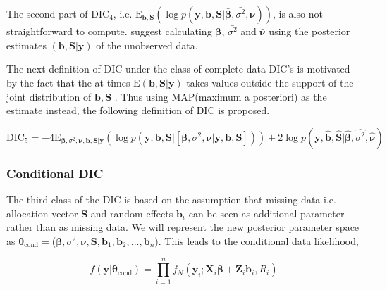 The second part of $\text{DIC}_4$, i.e. $\text{E}_{\boldsymbol{b},\boldsymbol{S}}(\log{p(\boldsymbol{y}, \boldsymbol{b}, \boldsymbol{S}|\boldsymbol{\bar{\beta}}, \bar{\sigma^2}, \boldsymbol{\bar{\nu}})})$, is also not straightforward to compute. \citet{celeux_deviance_2006} suggest calculating $\boldsymbol{\bar{\beta}}$, $\bar{\sigma^2}$ and $\boldsymbol{\bar{\nu}}$ using the posterior estimates $(\boldsymbol{b}, \boldsymbol{S} | \boldsymbol{y})$ of the unobserved data. 

The next definition of DIC under the class of complete data DIC's is motivated by the fact that the at times $\text{E}(\boldsymbol{b}, \boldsymbol{S}|\boldsymbol{y})$ takes values outside the support of the joint distribution of $\boldsymbol{b}, \boldsymbol{S}$ \citet{celeux_deviance_2006}. Thus using MAP(maximum a posteriori) as the estimate instead, the following definition of DIC is proposed.

\begin{equation}
\label{eq : DIC5}
\text{DIC}_5 = -4\text{E}_{\boldsymbol{\beta}, \sigma^2, \boldsymbol{\nu},\boldsymbol{b}, \boldsymbol{S}|\boldsymbol{y}}(\log{p(\boldsymbol{y}, \boldsymbol{b}, \boldsymbol{S}|[\boldsymbol{\beta}, \sigma^2, \boldsymbol{\nu}|\boldsymbol{y}, \boldsymbol{b}, \boldsymbol{S}])}) + 
2\log{p(\boldsymbol{y}, \boldsymbol{\hat{b}}, \boldsymbol{\hat{S}}|\boldsymbol{\hat{\beta}}, \hat{\sigma^2}, \boldsymbol{\hat{\nu}})}
\end{equation}

\subsubsection{Conditional DIC}
The third class of the DIC is based on the assumption that missing data i.e. allocation vector $\boldsymbol{S}$ and random effects $\boldsymbol{b}_i$ can be seen as additional parameter rather than as missing data. We will represent the new posterior parameter space as $\boldsymbol{\theta}_\text{cond} = $($\boldsymbol{\beta}, \sigma^2, \boldsymbol{\nu}, \boldsymbol{S}, \boldsymbol{b}_1, \boldsymbol{b}_2, ..., \boldsymbol{b}_n)$. This leads to the conditional data likelihood,

\begin{equation}
\label{eq : conditional_data_likelihood}
f(\boldsymbol{y}|\boldsymbol{\theta}_\text{cond}) = \prod_{i=1}^n f_N(\boldsymbol{y}_i; \boldsymbol{X}_i\boldsymbol{\beta} + \boldsymbol{Z}_i \boldsymbol{b}_i, R_i)
\end{equation}


